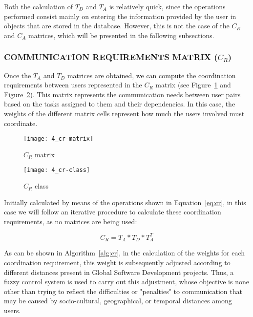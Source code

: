 Both the calculation of $T_D$ and $T_A$ is relatively quick, since the operations performed consist mainly on entering the information provided by the user in objects that are stored in the database. However, this is not the case of the $C_R$ and $C_A$ matrices, which will be presented in the following subsections.

\subsubsection{COMMUNICATION REQUIREMENTS MATRIX ($C_R$)}

Once the $T_A$ and $T_D$ matrices are obtained, we can compute the coordination requirements between users represented in the $C_R$ matrix (see Figure~\ref{fig:cr-matrix} and Figure~\ref{fig:cr-class}). This matrix represents the communication needs between user pairs based on the tasks assigned to them and their dependencies. In this case, the weights of the different matrix cells represent how much the users involved must coordinate.

\begin{figure}
	\centering
	\texttt{[image: 4\_cr-matrix]}
	\caption[$C_R$ matrix]{$C_R$ matrix}
	\label{fig:cr-matrix}
\end{figure}

\begin{figure}
	\centering
	\texttt{[image: 4\_cr-class]}
	\caption[$C_R$ class]{$C_R$ class}
	\label{fig:cr-class}
\end{figure}

Initially calculated by means of the operations shown in Equation~\ref{eq:cr}, in this case we will follow an iterative procedure to calculate these coordination requirements, as no matrices are being used:

\begin{equation}
	\label{eq:cr}
	C_R = T_A * T_D * T_A^T
\end{equation}

As can be shown in Algorithm~\ref{alg:cr}, in the calculation of the weights for each coordination requirement, this weight is subsequently adjusted according to different distances present in Global Software Development projects. Thus, a fuzzy control system is used to carry out this adjustment, whose objective is none other than trying to reflect the difficulties or "penalties" to communication that may be caused by socio-cultural, geographical, or temporal distances among users.

